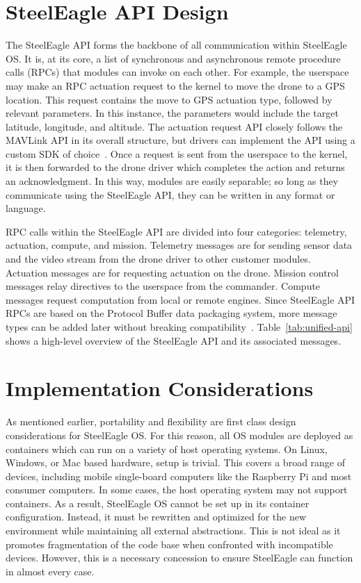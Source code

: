 \section{SteelEagle API Design}
\label{sec:se-api}
The SteelEagle API forms the backbone of all communication within SteelEagle OS. It is, at its core, a list of synchronous and asynchronous remote procedure calls (RPCs) that modules can invoke on each other. For example, the userspace may make an RPC actuation request to the kernel to move the drone to a GPS location. This request contains the move to GPS actuation type, followed by relevant parameters. In this instance, the parameters would include the target latitude, longitude, and altitude. The actuation request API closely follows the MAVLink API in its overall structure, but drivers can implement the API using a custom SDK of choice~\cite{MAVLink}. Once a request is sent from the userspace to the kernel, it is then forwarded to the drone driver which completes the action and returns an acknowledgment. In this way, modules are easily separable; so long as they communicate using the SteelEagle API, they can be written in any format or language.

RPC calls within the SteelEagle API are divided into four categories: telemetry, actuation, compute, and mission. Telemetry messages are for sending sensor data and the video stream from the drone driver to other customer modules. Actuation messages are for requesting actuation on the drone. Mission control messages relay directives to the userspace from the commander. Compute messages request computation from local or remote engines. Since SteelEagle API RPCs are based on the Protocol Buffer data packaging system, more message types can be added later without breaking compatibility~\cite{Protobuf}. Table~\ref{tab:unified-api} shows a high-level overview of the SteelEagle API and its associated messages.

\section{Implementation Considerations}
As mentioned earlier, portability and flexibility are first class design considerations for SteelEagle OS. For this reason, all OS modules are deployed as containers which can run on a variety of host operating systems. On Linux, Windows, or Mac based hardware, setup is trivial. This covers a broad range of devices, including mobile single-board computers like the Raspberry Pi and most consumer computers. In some cases, the host operating system may not support containers. As a result, SteelEagle OS cannot be set up in its container configuration. Instead, it must be rewritten and optimized for the new environment while maintaining all external abstractions. This is not ideal as it promotes fragmentation of the code base when confronted with incompatible devices. However, this is a necessary concession to ensure SteelEagle can function in almost every case.


